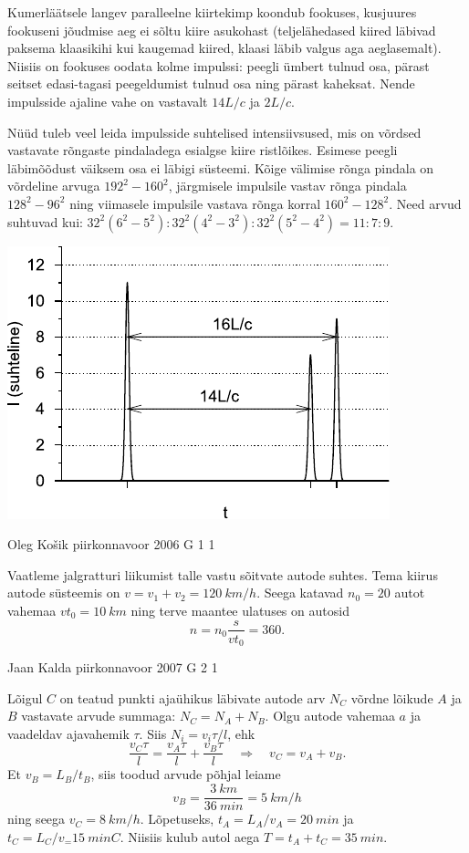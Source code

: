\documentclass[11pt]{article}
\begin{document}
{{Kumerläätsele langev paralleelne kiirtekimp koondub fookuses, kusjuures fookuseni jõudmise aeg ei sõltu kiire asukohast (teljelähedased kiired läbivad paksema klaasikihi kui kaugemad kiired, klaasi läbib valgus aga aeglasemalt). Niisiis on fookuses oodata kolme impulssi: peegli ümbert tulnud osa, pärast seitset edasi-tagasi peegeldumist tulnud osa ning pärast kaheksat. Nende impulsside ajaline vahe on vastavalt $14L/c$ ja $2L/c$.

Nüüd tuleb veel leida impulsside suhtelised intensiivsused, mis on võrdsed vastavate rõngaste pindaladega esialgse kiire ristlõikes. Esimese peegli läbimõõdust väiksem osa ei läbigi süsteemi. Kõige välimise rõnga pindala on võrdeline arvuga $192^2 - 160^2$, järgmisele impulsile vastav rõnga pindala $128^2 - 96^2$ ning viimasele impulsile vastava rõnga korral $160^2 - 128^2$. Need arvud suhtuvad kui: $32^2(6^2 - 5^2) : 32^2 (4^2 - 3^2) : 32^2 (5^2 - 4^2) = 11 : 7 : 9$.

\begin{center}
	\includegraphics[width=0.6\linewidth]{2006-v3g-09-lah}
\end{center}
\fi
}

{Oleg Košik} %
{piirkonnavoor} %
{2006} %
{G 1} %
{1} %
{

\ifSolution
Vaatleme jalgratturi liikumist talle vastu sõitvate autode suhtes. Tema kiirus autode süsteemis on $v = v_1 + v_2 = \SI{120}{km/h}$. Seega katavad $n_0 = 20$ autot vahemaa $vt_0 = \SI{10}{km}$ ning terve maantee ulatuses on autosid
\[
n = n_0 \frac{s}{vt_0} = \num{360}. 
\]
\fi
}

{Jaan Kalda} %
{piirkonnavoor} %
{2007} %
{G 2} %
{1} %
{

\ifSolution
Lõigul $C$ on teatud punkti ajaühikus läbivate autode arv $N_C$ võrdne lõikude $A$ ja $B$ vastavate arvude summaga: $N_C = N_A + N_B$. Olgu autode vahemaa $a$ ja vaadeldav ajavahemik $\tau$. Siis $N_i = v_i\tau /l$, ehk 
\[
\frac{v_{C} \tau}{l}=\frac{v_{A} \tau}{l}+\frac{v_{B} \tau}{l} \quad \Rightarrow \quad v_{C}=v_{A}+v_{B}.
\]
Et $v_B = L_B/t_B$, siis toodud arvude põhjal leiame 
\[
v_{B}=\frac{\SI{3}{km}}{\SI{36}{min}}=\SI{5}{km/h}
\]
ning seega $v_C = \SI{8}{km/h}$. Lõpetuseks, $t_A = L_A/v_A=\SI{20}{min}$ ja $t_C = L_C/v_ = \SI{15}{min}C$. Niisiis kulub autol aega $T = t_A + t_C = \SI{35}{min}$.
\fi
}

}
\end{document}
